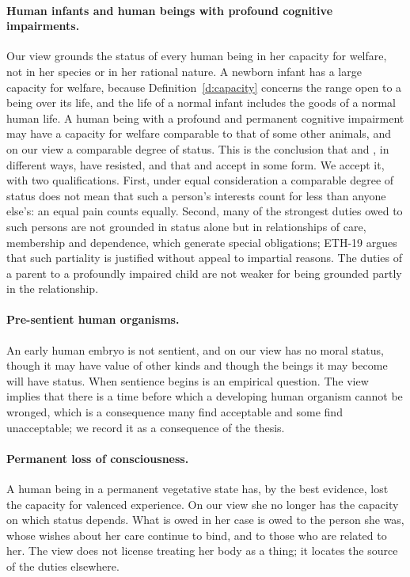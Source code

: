 \documentclass{situationist-preprint}
\begin{document}
\paragraph{Human infants and human beings with profound cognitive impairments.} Our view grounds the status of every human being in her capacity for welfare, not in her species or in her rational nature. A newborn infant has a large capacity for welfare, because Definition~\ref{d:capacity} concerns the range open to a being over its life, and the life of a normal infant includes the goods of a normal human life. A human being with a profound and permanent cognitive impairment may have a capacity for welfare comparable to that of some other animals, and on our view a comparable degree of status. This is the conclusion that \citet{Kittay2005} and \citet{Williams2006}, in different ways, have resisted, and that \citet{McMahan2002} and \citet{Kagan2016} accept in some form. We accept it, with two qualifications. First, under equal consideration a comparable degree of status does not mean that such a person's interests count for less than anyone else's: an equal pain counts equally. Second, many of the strongest duties owed to such persons are not grounded in status alone but in relationships of care, membership and dependence, which generate special obligations; ETH-19 argues that such partiality is justified without appeal to impartial reasons. The duties of a parent to a profoundly impaired child are not weaker for being grounded partly in the relationship.

\paragraph{Pre-sentient human organisms.} An early human embryo is not sentient, and on our view has no moral status, though it may have value of other kinds and though the beings it may become will have status. When sentience begins is an empirical question. The view implies that there is a time before which a developing human organism cannot be wronged, which is a consequence many find acceptable and some find unacceptable; we record it as a consequence of the thesis.

\paragraph{Permanent loss of consciousness.} A human being in a permanent vegetative state has, by the best evidence, lost the capacity for valenced experience. On our view she no longer has the capacity on which status depends. What is owed in her case is owed to the person she was, whose wishes about her care continue to bind, and to those who are related to her. The view does not license treating her body as a thing; it locates the source of the duties elsewhere.
\end{document}
